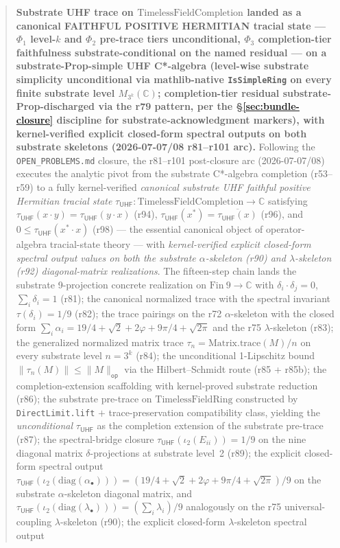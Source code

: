 \documentclass[11pt,a4paper]{amsart}
\theoremstyle{plain}
\theoremstyle{definition}
\begin{document}
\begin{abstract}
\textbf{Substrate UHF trace on $\text{TimelessFieldCompletion}$ landed as a canonical FAITHFUL POSITIVE HERMITIAN tracial state --- $\Phi_1$ level-$k$ and $\Phi_2$ pre-trace tiers unconditional, $\Phi_3$ completion-tier faithfulness substrate-conditional on the named residual  --- on a substrate-Prop-simple UHF C*-algebra (level-wise substrate simplicity unconditional via mathlib-native \texttt{IsSimpleRing} on every finite substrate level $M_{3^k}(\mathbb{C})$; completion-tier residual  substrate-Prop-discharged via the r79 pattern, per the \S\ref{sec:bundle-closure} discipline for substrate-acknowledgment markers), with kernel-verified explicit closed-form spectral outputs on both substrate skeletons (2026-07-07/08 r81--r101 arc).} Following the \texttt{OPEN\_PROBLEMS.md} closure, the r81--r101 post-closure arc (2026-07-07/08) executes the analytic pivot from the substrate C*-algebra completion (r53--r59) to a fully kernel-verified \emph{canonical substrate UHF faithful positive Hermitian tracial state} $\tau_{\textsf{UHF}} \colon \text{TimelessFieldCompletion} \to \mathbb{C}$ satisfying $\tau_{\textsf{UHF}}(x \cdot y) = \tau_{\textsf{UHF}}(y \cdot x)$ (r94), $\tau_{\textsf{UHF}}(x^*) = \overline{\tau_{\textsf{UHF}}(x)}$ (r96), and $0 \le \tau_{\textsf{UHF}}(x^* \cdot x)$ (r98) --- the essential canonical object of operator-algebra tracial-state theory --- with \emph{kernel-verified explicit closed-form spectral output values on both the substrate $\alpha$-skeleton (r90) and $\lambda$-skeleton (r92) diagonal-matrix realizations}. The fifteen-step chain lands the substrate 9-projection concrete realization on $\mathrm{Fin}~9 \to \mathbb{C}$ with $\delta_i \cdot \delta_j = 0$, $\sum_i \delta_i = 1$ (r81); the canonical normalized trace with the spectral invariant $\tau(\delta_i) = 1/9$ (r82); the trace pairings on the r72 $\alpha$-skeleton with the closed form $\sum_i \alpha_i = 19/4 + \sqrt{2} + 2\varphi + 9\pi/4 + \sqrt{2\pi}$ and the r75 $\lambda$-skeleton (r83); the generalized normalized matrix trace $\tau_n = \mathrm{Matrix.trace}(M)/n$ on every substrate level $n = 3^k$ (r84); the unconditional 1-Lipschitz bound $\|\tau_n(M)\| \le \|M\|_{\textsf{op}}$ via the Hilbert--Schmidt route (r85 + r85b); the completion-extension scaffolding with kernel-proved substrate reduction (r86); the substrate pre-trace on $\mathrm{TimelessFieldRing}$ constructed by \texttt{DirectLimit.lift} $+$ trace-preservation compatibility class, yielding the \emph{unconditional} $\tau_{\textsf{UHF}}$ as the completion extension of the substrate pre-trace (r87); the spectral-bridge closure $\tau_{\textsf{UHF}}(\iota_2(E_{ii})) = 1/9$ on the nine diagonal matrix $\delta$-projections at substrate level~2 (r89); the explicit closed-form spectral output $\tau_{\textsf{UHF}}(\iota_2(\mathrm{diag}(\alpha_{\bullet}))) = (19/4 + \sqrt{2} + 2\varphi + 9\pi/4 + \sqrt{2\pi})/9$ on the substrate $\alpha$-skeleton diagonal matrix, and $\tau_{\textsf{UHF}}(\iota_2(\mathrm{diag}(\lambda_{\bullet}))) = (\sum_i \lambda_i)/9$ analogously on the r75 universal-coupling $\lambda$-skeleton (r90); the explicit closed-form $\lambda$-skeleton spectral output 
\end{abstract}
\end{document}
